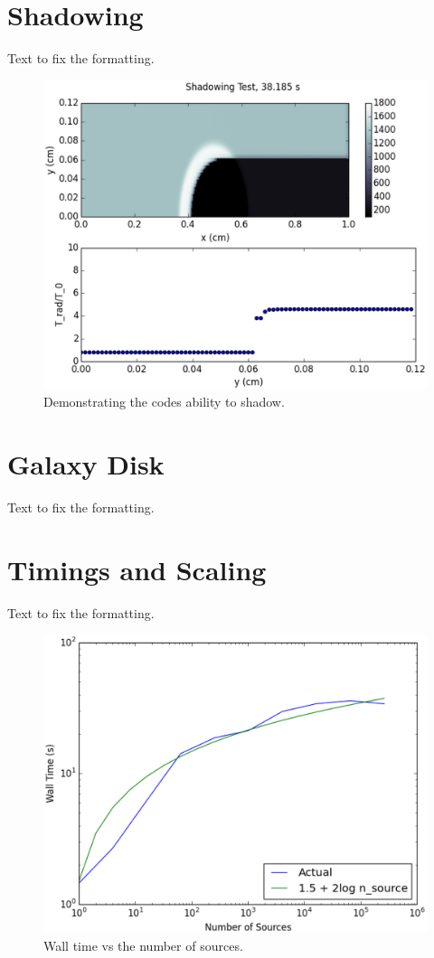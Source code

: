 \section{Shadowing}
\label{sec:shadowing}

Text to fix the formatting.

\begin{figure}
\includegraphics[width=\textwidth]{graphics/shadow10000.eps}
\caption[Shadowing.]{Demonstrating the codes ability to shadow.}
\label{fig:shadow}
\end{figure}

\section{Galaxy Disk}
\label{sec:galaxydisk}

Text to fix the formatting.

\section{Timings and Scaling}
\label{sec:timing}

Text to fix the formatting.

\begin{figure}
\includegraphics[width=\textwidth]{graphics/Timings.eps}
\caption[Wall time vs the number of sources.]{Wall time vs the number of sources.}
\label{fig:scaling}
\end{figure}

